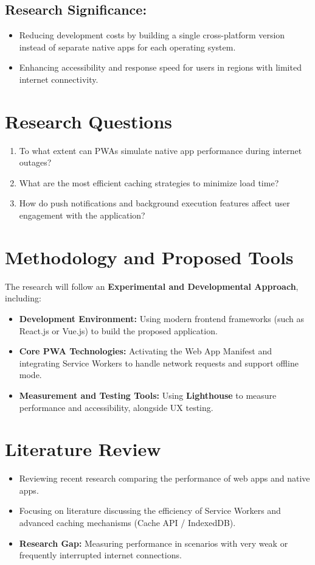 \documentclass[12pt, a4paper]{article}
\begin{document}
\subsection{Research Significance:}
\begin{itemize}
    \item Reducing development costs by building a single cross-platform version instead of separate native apps for each operating system.
    \item Enhancing accessibility and response speed for users in regions with limited internet connectivity.
\end{itemize}

\section{Research Questions}
\begin{enumerate}
    \item To what extent can PWAs simulate native app performance during internet outages?
    \item What are the most efficient caching strategies to minimize load time?
    \item How do push notifications and background execution features affect user engagement with the application?
\end{enumerate}

\section{Methodology and Proposed Tools}
The research will follow an \textbf{Experimental and Developmental Approach}, including:
\begin{itemize}
    \item \textbf{Development Environment:} Using modern frontend frameworks (such as React.js or Vue.js) to build the proposed application.
    \item \textbf{Core PWA Technologies:} Activating the Web App Manifest and integrating Service Workers to handle network requests and support offline mode.
    \item \textbf{Measurement and Testing Tools:} Using \textbf{Lighthouse} to measure performance and accessibility, alongside UX testing.
\end{itemize}

\section{Literature Review}
\begin{itemize}
    \item Reviewing recent research comparing the performance of web apps and native apps.
    \item Focusing on literature discussing the efficiency of Service Workers and advanced caching mechanisms (Cache API / IndexedDB).
    \item \textbf{Research Gap:} Measuring performance in scenarios with very weak or frequently interrupted internet connections.
\end{itemize}
\end{document}
